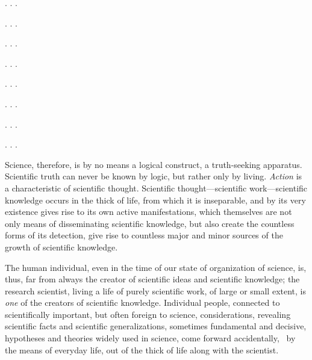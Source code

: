 \Section %

. . .

\Section %

. . .

\Section %

. . .

\Section %

. . .

\Section %

. . .

\Section %

. . .

\Section %

. . .

\Section %

. . .

\Section %
Science, therefore, is by no means a logical construct, a truth-seeking
apparatus.  Scientific truth can never be known by logic, but rather only by
living.  \emph{Action }is a characteristic of scientific thought.  Scientific
thought---scientific work---scientific knowledge occurs in the thick of life,
from which it is inseparable, and by its very existence gives rise to its own
active manifestations, which themselves are not only means of disseminating
scientific knowledge, but also create the countless forms of its detection,
give rise to countless major and minor sources of the growth of scientific
knowledge.

The human individual, even in the time of our state of organization of science,
is, thus, far from always the creator of scientific ideas and scientific
knowledge; the research scientist, living a life of purely scientific work, of
large or small extent, is \emph{one} of the creators of scientific knowledge.
Individual people, connected to scientifically important, but often foreign to
science, considerations, revealing scientific facts and scientific
generalizations, sometimes fundamental and decisive, hypotheses and theories
widely used in science, come forward accidentally, \ie\ by the means of
everyday life, out of the thick of life along with the scientist.

